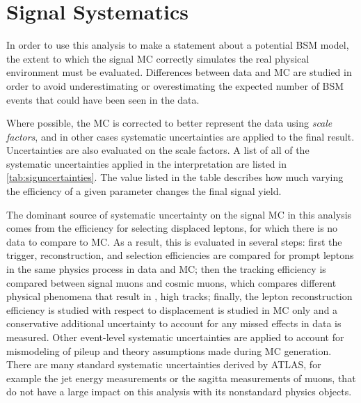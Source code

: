 \chapter{Signal Systematics}
\label{chap:systematics}

In order to use this analysis to make a statement about a potential \ac{BSM} model, the extent to which the signal \ac{MC} correctly simulates the real physical environment must be evaluated. Differences between data and \ac{MC} are studied in order to avoid underestimating or overestimating the expected number of \ac{BSM} events that could have been seen in the data.

Where possible, the \ac{MC} is corrected to better represent the data using \emph{scale factors}, and in other cases systematic uncertainties are applied to the final result. Uncertainties are also evaluated on the scale factors. A list of all of the systematic uncertainties applied in the interpretation are listed in \autoref{tab:siguncertainties}. The value listed in the table describes how much varying the efficiency of a given parameter changes the final signal yield. 

The dominant source of systematic uncertainty on the signal \ac{MC} in this analysis comes from the efficiency for selecting displaced leptons, for which there is no data to compare to \ac{MC}. As a result, this is evaluated in several steps: first the trigger, reconstruction, and selection efficiencies are compared for prompt leptons in the same physics process in data and \ac{MC}; then the tracking efficiency is compared between signal muons and cosmic muons, which compares different physical phenomena that result in \pt, high \absdz tracks; finally, the lepton reconstruction efficiency is studied with respect to displacement is studied in \ac{MC} only and a conservative additional uncertainty to account for any missed effects in data is measured. Other event-level systematic uncertainties are applied to account for mismodeling of pileup and theory assumptions made during \ac{MC} generation. There are many standard systematic uncertainties derived by \ac{ATLAS}, for example the jet energy measurements or the sagitta measurements of muons, that do not have a large impact on this analysis with its nonstandard physics objects.

